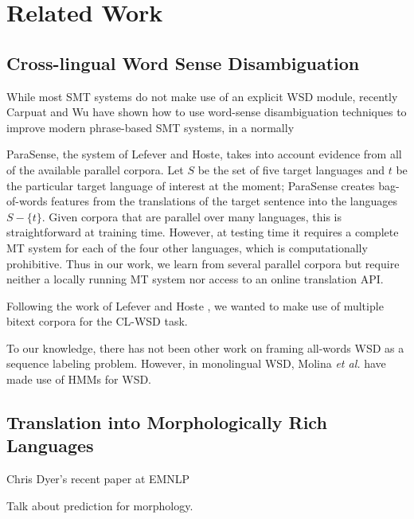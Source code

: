 \section{Related Work}
\label{sec:relatedwork}

\subsection{Cross-lingual Word Sense Disambiguation}

While most SMT systems do not make use of an explicit WSD module, recently
Carpuat and Wu have shown how to use word-sense disambiguation techniques to
improve modern phrase-based SMT systems, in a normally 

\cite{carpuatpsd,carpuat-wu:2007:EMNLP-CoNLL2007,carpuat2008evaluation}


ParaSense, the system of Lefever
and Hoste, takes into account evidence from all of the available parallel
corpora. Let $S$ be the set of five target languages and $t$ be the particular
target language of interest at the moment; ParaSense creates bag-of-words
features from the translations of the target sentence into the languages $S -
\lbrace{t \rbrace}$.
Given corpora that are parallel over many languages, this is straightforward at
training time. However, at testing time it requires a complete MT system for
each of the four other languages, which is computationally prohibitive. Thus in
our work, we learn from several parallel corpora but require neither a locally
running MT system nor access to an online translation API.

Following the work of Lefever and Hoste
, we wanted to make use of
multiple bitext corpora for the CL-WSD task.

To our knowledge, there has not been other work on framing all-words WSD as a
sequence labeling problem. However, in monolingual WSD, Molina \textit{et al.}
have made use of HMMs for WSD. 


\subsection{Translation into Morphologically Rich Languages}



Chris Dyer's recent paper at EMNLP
\cite{chahuneau:2013:emnlp}

Talk about prediction for morphology.
\cite{toutanova-suzuki-ruopp:2008:ACLMain}

